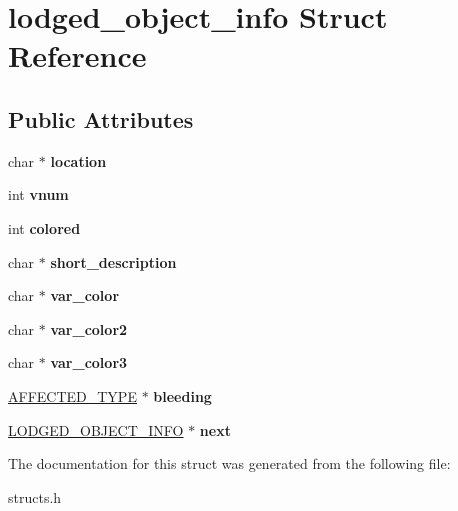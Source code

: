 \hypertarget{structlodged__object__info}{\section{lodged\-\_\-object\-\_\-info Struct Reference}
\label{structlodged__object__info}
}
\subsection*{Public Attributes}
\begin{DoxyCompactItemize}
\item 
\hypertarget{structlodged__object__info_abe0bd80a8b3f143aa295d14596cc7b4b}{char $\ast$ {\bfseries location}}\label{structlodged__object__info_abe0bd80a8b3f143aa295d14596cc7b4b}

\item 
\hypertarget{structlodged__object__info_a92eba40298d079eabeba79108fa760c6}{int {\bfseries vnum}}\label{structlodged__object__info_a92eba40298d079eabeba79108fa760c6}

\item 
\hypertarget{structlodged__object__info_a3392e3e8007dce751d2f08b0f8780553}{int {\bfseries colored}}\label{structlodged__object__info_a3392e3e8007dce751d2f08b0f8780553}

\item 
\hypertarget{structlodged__object__info_aacc602b89467eb3113207959551d867c}{char $\ast$ {\bfseries short\-\_\-description}}\label{structlodged__object__info_aacc602b89467eb3113207959551d867c}

\item 
\hypertarget{structlodged__object__info_a500dde882cb024dad05652e6a74b504b}{char $\ast$ {\bfseries var\-\_\-color}}\label{structlodged__object__info_a500dde882cb024dad05652e6a74b504b}

\item 
\hypertarget{structlodged__object__info_af8fad921ce3dd7335ff8c290d8799621}{char $\ast$ {\bfseries var\-\_\-color2}}\label{structlodged__object__info_af8fad921ce3dd7335ff8c290d8799621}

\item 
\hypertarget{structlodged__object__info_a7202f04109e336635884bf89a8826b60}{char $\ast$ {\bfseries var\-\_\-color3}}\label{structlodged__object__info_a7202f04109e336635884bf89a8826b60}

\item 
\hypertarget{structlodged__object__info_a4cdb34c04d17436b9bfd8551de4b61d8}{\hyperlink{structaffected__type}{A\-F\-F\-E\-C\-T\-E\-D\-\_\-\-T\-Y\-P\-E} $\ast$ {\bfseries bleeding}}\label{structlodged__object__info_a4cdb34c04d17436b9bfd8551de4b61d8}

\item 
\hypertarget{structlodged__object__info_ab731d64c989dc955e95d2f17219b51bc}{\hyperlink{structlodged__object__info}{L\-O\-D\-G\-E\-D\-\_\-\-O\-B\-J\-E\-C\-T\-\_\-\-I\-N\-F\-O} $\ast$ {\bfseries next}}\label{structlodged__object__info_ab731d64c989dc955e95d2f17219b51bc}

\end{DoxyCompactItemize}


The documentation for this struct was generated from the following file\-:\begin{DoxyCompactItemize}
\item 
structs.\-h\end{DoxyCompactItemize}
